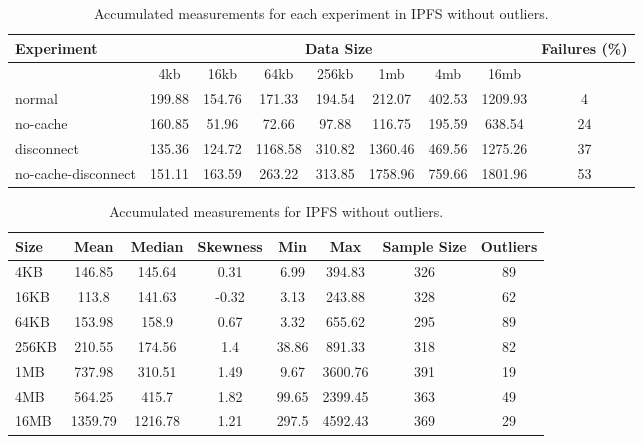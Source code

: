 \begin{table}[H]
\centering
\begin{small}
\caption{Accumulated measurements for each experiment in IPFS without outliers.}
\begin{tabular}{@{}lcccccccc@{}}
\toprule
Experiment    & \multicolumn{7}{c}{Data Size}          & Failures (\%) \\ \midrule
& 4kb  & 16kb  & 64kb  & 256kb  & 1mb  & 4mb  & 16mb              \\ \midrule
normal & 199.88 & 154.76 & 171.33 & 194.54 & 212.07 & 402.53 & 1209.93 & 4 \\
no-cache  & 160.85 & 51.96 & 72.66 & 97.88 & 116.75 & 195.59 & 638.54 & 24 \\
disconnect  & 135.36 & 124.72 & 1168.58 & 310.82 & 1360.46 & 469.56 & 1275.26 & 37 \\
no-cache-disconnect  & 151.11 & 163.59 & 263.22 & 313.85 & 1758.96 & 759.66 & 1801.96  & 53 \\
\bottomrule
\end{tabular}
\end{small}
\end{table}



\begin{table}[H]
\centering
\begin{small}
\caption{Accumulated measurements for IPFS without outliers.}
\begin{tabular}{@{}lccccccc@{}}
\toprule
Size & Mean & Median & Skewness & Min & Max & Sample Size & Outliers \\ \midrule
4KB & 146.85 & 145.64 & 0.31 & 6.99 & 394.83 & 326 & 89\\
16KB & 113.8 & 141.63 & -0.32 & 3.13 & 243.88 & 328 & 62\\
64KB & 153.98 & 158.9 & 0.67 & 3.32 & 655.62 & 295 & 89\\
256KB & 210.55 & 174.56 & 1.4 & 38.86 & 891.33 & 318 & 82\\
1MB & 737.98 & 310.51 & 1.49 & 9.67 & 3600.76 & 391 & 19\\
4MB & 564.25 & 415.7 & 1.82 & 99.65 & 2399.45 & 363 & 49\\
16MB & 1359.79 & 1216.78 & 1.21 & 297.5 & 4592.43 & 369 & 29\\
\bottomrule
\end{tabular}
\end{small}
\end{table}

